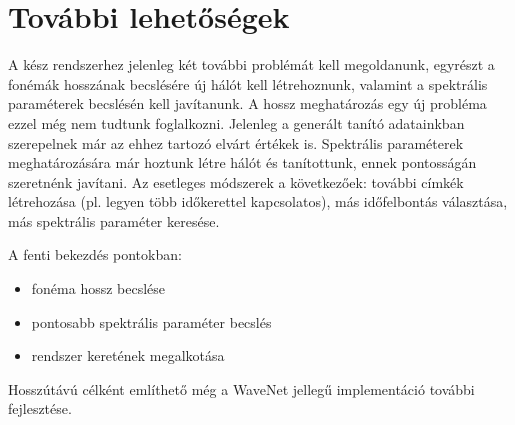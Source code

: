 \section{További lehetőségek}

A kész rendszerhez jelenleg két további problémát kell megoldanunk, egyrészt a fonémák hosszának becslésére új hálót kell létrehoznunk, valamint a spektrális paraméterek becslésén kell javítanunk. A hossz meghatározás egy új probléma ezzel még nem tudtunk foglalkozni. Jelenleg a generált tanító adatainkban szerepelnek már az ehhez tartozó elvárt értékek is. Spektrális paraméterek meghatározására már hoztunk létre hálót és tanítottunk, ennek pontosságán szeretnénk javítani. Az esetleges módszerek a következőek: további címkék létrehozása (pl. legyen több időkerettel kapcsolatos), más időfelbontás választása, más spektrális paraméter keresése.

A fenti bekezdés pontokban:

\begin{itemize}
	\item fonéma hossz becslése
	\item pontosabb spektrális paraméter becslés
	\item rendszer keretének megalkotása
\end{itemize}

Hosszútávú célként említhető még a WaveNet jellegű implementáció további fejlesztése.